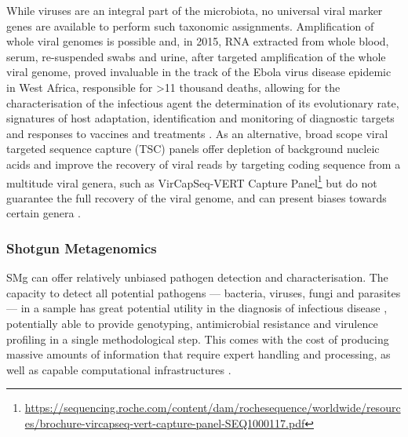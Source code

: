 While viruses are an integral part of the microbiota, no universal viral marker genes are available to perform such taxonomic assignments. 
Amplification of whole viral genomes is possible and, in 2015, RNA extracted from whole blood, serum, re-suspended swabs and urine, after targeted amplification of the whole viral genome, proved invaluable in the track of the Ebola virus disease epidemic in West Africa, responsible for >11 thousand deaths, allowing for the characterisation of the infectious agent the determination of its evolutionary rate, signatures of host adaptation, identification and monitoring of diagnostic targets and responses to vaccines and treatments \citep{quick_real-time_2016}.
As an alternative, broad scope viral targeted sequence capture (TSC) panels offer depletion of background nucleic acids and improve the recovery of viral reads by targeting coding sequence from a multitude viral genera, such as VirCapSeq-VERT Capture Panel\footnote{\url{https://sequencing.roche.com/content/dam/rochesequence/worldwide/resources/brochure-vircapseq-vert-capture-panel-SEQ1000117.pdf}} but do not guarantee the full recovery of the viral genome, and can present biases towards certain genera \citep{schuele_assessment_2020, wylie_enhanced_2015}. 

\subsubsection{Shotgun Metagenomics} \label{sssec:_intro_shotgun_metagenomics}

\ac{SMg} can offer relatively unbiased pathogen detection and characterisation. The capacity to detect all potential pathogens — bacteria, viruses, fungi and parasites — in a sample has great potential utility in the diagnosis of infectious disease \citep{chiu_clinical_2019}, potentially able to provide genotyping, antimicrobial resistance and virulence profiling in a single methodological step. This comes with the cost of producing massive amounts of information that require expert handling and processing, as well as capable computational infrastructures \citep{couto_critical_2018, rossen_practical_2018}.


